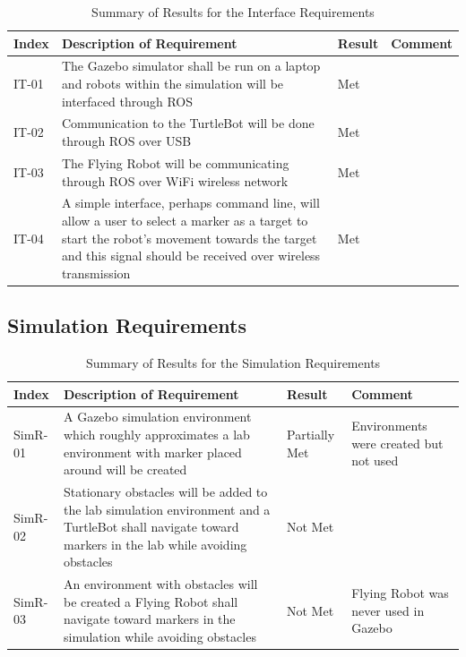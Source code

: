 \documentclass{article}[12]
\begin{document}
	\begin{table}[H]
  \small
		\begin{tabular}{p{2cm} p{8cm} p{2cm} p{3cm}}
			\hline
			{\textbf{Index}} & {\textbf{Description of Requirement}} & {\textbf{Result}} & {\textbf{Comment}} \\ \hline
IT-01 & The Gazebo simulator shall be run on a laptop and robots within the simulation will be interfaced through ROS & Met & \\
IT-02 & Communication to the TurtleBot will be done through ROS over USB & Met & \\
IT-03 & The Flying Robot will be communicating through ROS over WiFi wireless network & Met &\\
IT-04 & A simple interface, perhaps command line, will allow a user to select a marker as a target to start the robot's movement towards the target and this signal should be received over wireless transmission & Met & \\ \hline
		\end{tabular}
		\caption{Summary of Results for the Interface Requirements}
		\label{table:interresults}
 \end{table}
 
 \subsection{Simulation Requirements}

	\begin{table}[H]
  \small
		\begin{tabular}{p{2cm} p{8cm} p{2cm} p{3cm}}
			\hline
			{\textbf{Index}} & {\textbf{Description of Requirement}} & {\textbf{Result}} & {\textbf{Comment}} \\ \hline
SimR-01 & A Gazebo simulation environment which roughly approximates a lab environment with marker placed around will be created & Partially Met & Environments were created but not used\\
SimR-02 & Stationary obstacles will be added to the lab simulation environment and a TurtleBot shall navigate toward markers in the lab while avoiding obstacles & Not Met & \\
SimR-03 & An environment with obstacles will be created a Flying Robot shall navigate toward markers in the simulation while avoiding obstacles & Not Met & Flying Robot was never used in Gazebo \\ \hline
		\end{tabular}
		\caption{Summary of Results for the Simulation Requirements}
		\label{table:simresults}
 \end{table}
\end{document}
